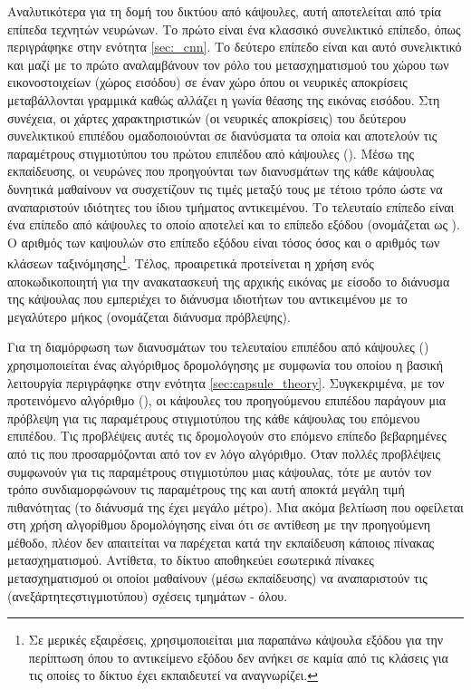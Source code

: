Αναλυτικότερα για τη δομή του δικτύου από κάψουλες, αυτή αποτελείται από τρία επίπεδα τεχνητών νευρώνων. Το πρώτο είναι ένα κλασσικό συνελικτικό επίπεδο, όπως περιγράφηκε στην ενότητα \ref{sec:_cnn}. Το δεύτερο επίπεδο είναι και αυτό συνελικτικό και μαζί με το πρώτο αναλαμβάνουν τον ρόλο του μετασχηματισμού του χώρου των εικονοστοιχείων (χώρος εισόδου) σε έναν χώρο όπου οι νευρικές αποκρίσεις μεταβάλλονται γραμμικά καθώς αλλάζει η γωνία θέασης της εικόνας εισόδου. Στη συνέχεια, οι χάρτες χαρακτηριστικών (οι νευρικές αποκρίσεις) του δεύτερου συνελικτικού επιπέδου ομαδοποιούνται σε διανύσματα τα οποία και αποτελούν τις παραμέτρους στιγμιοτύπου του πρώτου επιπέδου από κάψουλες (). Μέσω της εκπαίδευσης, οι νευρώνες που προηγούνται των διανυσμάτων της κάθε κάψουλας δυνητικά μαθαίνουν να συσχετίζουν τις τιμές μεταξύ τους με τέτοιο τρόπο ώστε να αναπαριστούν ιδιότητες του ίδιου τμήματος αντικειμένου. Το τελευταίο επίπεδο είναι ένα επίπεδο από κάψουλες το οποίο αποτελεί και το επίπεδο εξόδου (ονομάζεται ως ). Ο αριθμός των καψουλών στο επίπεδο εξόδου είναι τόσος όσος και ο αριθμός των κλάσεων ταξινόμησης\footnote{Σε μερικές εξαιρέσεις, χρησιμοποιείται μια παραπάνω κάψουλα εξόδου για την περίπτωση όπου το αντικείμενο εξόδου δεν ανήκει σε καμία από τις κλάσεις για τις οποίες το δίκτυο έχει εκπαιδευτεί να αναγνωρίζει.}. Τέλος, προαιρετικά προτείνεται η χρήση ενός αποκωδικοποιητή για την ανακατασκευή της αρχικής εικόνας με είσοδο το διάνυσμα της κάψουλας που εμπεριέχει το διάνυσμα ιδιοτήτων του αντικειμένου με το μεγαλύτερο μήκος (ονομάζεται διάνυσμα πρόβλεψης).\par

Για τη διαμόρφωση των διανυσμάτων του τελευταίου επιπέδου από κάψουλες () χρησιμοποιείται ένας αλγόριθμος δρομολόγησης με συμφωνία του οποίου η βασική λειτουργία περιγράφηκε στην ενότητα \ref{sec:capsule_theory}. Συγκεκριμένα, με τον προτεινόμενο αλγόριθμο  (), οι κάψουλες του προηγούμενου επιπέδου παράγουν μια πρόβλεψη για τις παραμέτρους στιγμιοτύπου της κάθε κάψουλας του επόμενου επιπέδου. Τις προβλέψεις αυτές τις δρομολογούν στο επόμενο επίπεδο βεβαρημένες από τις  που προσαρμόζονται από τον εν λόγο αλγόριθμο. Όταν πολλές προβλέψεις συμφωνούν για τις παραμέτρους στιγμιοτύπου μιας κάψουλας, τότε με αυτόν τον τρόπο συνδιαμορφώνουν τις παραμέτρους της και αυτή αποκτά μεγάλη τιμή πιθανότητας (το διάνυσμά της έχει μεγάλο μέτρο). Μια ακόμα βελτίωση που οφείλεται στη χρήση αλγορίθμου δρομολόγησης είναι ότι σε αντίθεση με την προηγούμενη μέθοδο, πλέον δεν απαιτείται να παρέχεται κατά την εκπαίδευση κάποιος πίνακας μετασχηματισμού. Αντίθετα, το δίκτυο αποθηκεύει εσωτερικά πίνακες μετασχηματισμού οι οποίοι μαθαίνουν (μέσω εκπαίδευσης) να αναπαριστούν τις (ανεξάρτητες\textendash στιγμιοτύπου) σχέσεις τμημάτων - όλου.\par

